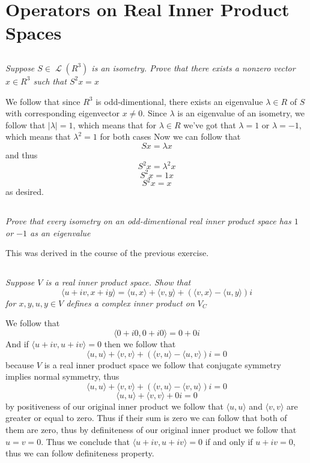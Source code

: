\documentclass[11pt,oneside,titlepage]{book}
\DeclareMathOperator \map {\mathcal {L}}
\newcommand{\eangle}[1]{\langle #1 \rangle}
\begin{document}
\section{Operators on Real Inner Product Spaces}

\subsection{}

\textit{Suppose $S \in \map(R^3)$ is an isometry. Prove that there exists a nonzero vector
  $x \in R^3$ such that $S^2x = x$}

We follow that since $R^3$ is odd-dimentional, there exists an eigenvalue $\lambda \in R$
of $S$ with corresponding eigenvector $x \neq 0$. Since $\lambda$ is
an eigenvalue of an isometry,
we follow that $|\lambda| = 1$, which means that for $\lambda \in R$ we've got that
$\lambda = 1$ or $\lambda = -1$, which means that $\lambda^2 = 1$ for both cases
Now we can follow that
$$Sx = \lambda x$$
and thus
$$S^2x = \lambda^2 x$$
$$S^2x = 1 x$$
$$S^2x = x$$
as desired.

\subsection{}

\textit{Prove that every isometry on an odd-dimentional real inner product space
  has $1$ or $-1$ as an eigenvalue }

This was derived in the course of the previous exercise.

\subsection{}

\textit{Suppose $V$ is a real inner product space. Show that
  $$\eangle{u + iv, x + iy} = \eangle{u, x} + \eangle{v, y} +
  (\eangle{v, x} - \eangle{u, y})i$$
  for $x, y, u, y \in V$ defines a complex inner product on $V_C$}

We follow that
$$\eangle{0 + i0, 0 + i0} = 0 + 0i$$
And if $\eangle{u + iv, u + iv} = 0$ then we follow that
$$\eangle{u, u} + \eangle{v, v} + (\eangle{v, u} - \eangle{u, v})i = 0$$
because $V$ is a real inner product space we follow that conjugate symmetry implies
normal symmetry, thus
$$\eangle{u, u} + \eangle{v, v} + (\eangle{v, u} - \eangle{v, u})i = 0$$
$$\eangle{u, u} + \eangle{v, v} + 0i = 0$$
by positiveness of our original inner product we follow that $\eangle{u, u}$ and
$\eangle{v, v}$ are greater or equal to zero. Thus if their sum is zero we can follow that
both of them are zero, thus by definiteness of our original inner product we follow
that $u = v  = 0$.
Thus we conclude that $\eangle{u + iv, u + iv} = 0$ if and only if $u + iv = 0$, thus
we can follow definiteness property.
\end{document}
